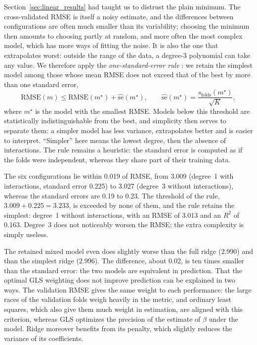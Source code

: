 \documentclass[11pt,a4paper]{article}
\begin{document}
Section~\ref{sec:linear_results} had taught us to distrust the plain minimum. The cross-validated RMSE is itself a
noisy estimate, and the differences between configurations are often much smaller than its variability; choosing the
minimum then amounts to choosing partly at random, and more often the most complex model, which has more ways of
fitting the noise. It is also the one that extrapolates worst: outside the range of the data, a degree-3 polynomial
can take any value. We therefore apply the \emph{one-standard-error rule} \citep{breiman1984, hastie2009}: we retain
the simplest model among those whose mean RMSE does not exceed that of the best by more than one standard error,
\[
\mathrm{RMSE}(m) \le \mathrm{RMSE}(m^\star) + \widehat{\mathrm{se}}(m^\star),\qquad
\widehat{\mathrm{se}}(m^\star) = \frac{s_{\text{folds}}(m^\star)}{\sqrt K},
\]
where $m^\star$ is the model with the smallest RMSE. Models below this threshold are statistically indistinguishable
from the best, and simplicity then serves to separate them: a simpler model has less variance, extrapolates better and
is easier to interpret. ``Simpler'' here means the lowest degree, then the absence of interactions. The rule remains a
heuristic: the standard error is computed as if the folds were independent, whereas they share part of their training
data.

The six configurations lie within 0.019 of RMSE, from 3.009 (degree~1 with interactions, standard error 0.225) to
3.027 (degree~3 without interactions), whereas the standard errors are 0.19 to 0.23. The threshold of the rule,
$3.009 + 0.225 = 3.233$, is exceeded by none of them, and the rule retains the simplest: degree~1 without interactions,
with an RMSE of 3.013 and an $R^2$ of 0.163. Degree~3 does not noticeably worsen the RMSE; the extra complexity is
simply useless.

The retained mixed model even does slightly worse than the full ridge (2.990) and than the simplest ridge (2.996). The
difference, about 0.02, is ten times smaller than the standard error: the two models are equivalent in prediction.
That the optimal GLS weighting does not improve prediction can be explained in two ways. The validation RMSE gives the
same weight to each performance: the large races of the validation folds weigh heavily in the metric, and ordinary
least squares, which also give them much weight in estimation, are aligned with this criterion, whereas GLS optimizes
the precision of the estimate of $\beta$ under the model. Ridge moreover benefits from its penalty, which slightly
reduces the variance of its coefficients.
\end{document}
